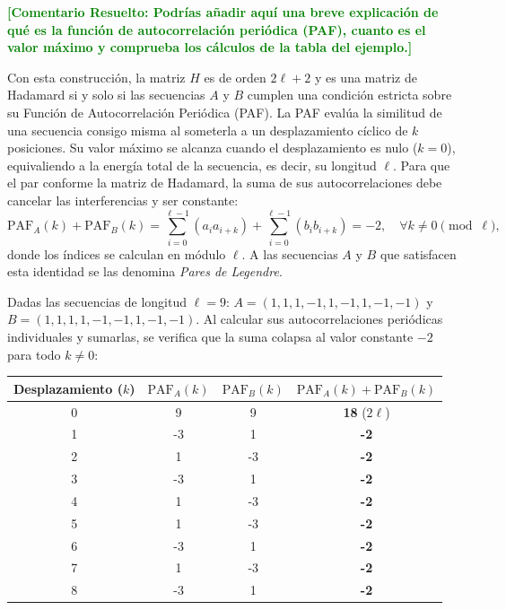 \documentclass[12pt,a4paper]{tfg_domingo}
\newcommand{\PAF}{\textrm{PAF}}
\newcommand{\ComentarioR}[1]{\textcolor{green}{\textbf{[Comentario Resuelto:
#1]}}}
\begin{document}
  \ComentarioR{Podrías añadir aquí una breve explicación de qué es la
  función de autocorrelación periódica (PAF), cuanto es el valor
  máximo y comprueba los cálculos de la tabla del ejemplo.}

  
Con esta construcción, la matriz $H$ es de orden $2\ell + 2$ y es una matriz de Hadamard si y solo si las secuencias $A$ y $B$ cumplen una condición estricta sobre su Función de Autocorrelación Periódica (PAF). La PAF evalúa la similitud de una secuencia consigo misma al someterla a un desplazamiento cíclico de $k$ posiciones. Su valor máximo se alcanza cuando el desplazamiento es nulo ($k=0$), equivaliendo a la energía total de la secuencia, es decir, su longitud $\ell$. Para que el par conforme la matriz de Hadamard, la suma de sus autocorrelaciones debe cancelar las interferencias y ser constante:
\[
 \PAF_{A}(k) + \PAF_{B}(k) = \sum_{i=0}^{\ell-1} (a_i a_{i+k}) + \sum_{i=0}^{\ell-1}( b_i b_{i+k}) = -2, \quad \forall k \neq 0 \pmod \ell,
\]
donde los índices se calculan en módulo $\ell$. A las secuencias $A$ y $B$ que satisfacen esta identidad se las denomina \emph{Pares de Legendre}.

\begin{tcolorbox}[colback=blue!5!white,colframe=blue!75!black,title=Ejemplo de Pares de Legendre]
  Dadas las secuencias de longitud $\ell=9$: 
  $A = (1, 1, 1, -1, 1, -1, 1, -1, -1)$ y $B = (1, 1, 1, 1, -1, -1, 1, -1, -1)$.
  Al calcular sus autocorrelaciones periódicas individuales y sumarlas, se verifica que la suma colapsa al valor constante $-2$ para todo $k \neq 0$:
  \begin{center}
        \begin{tabular}{c|c|c|c}
          Desplazamiento ($k$) & $\text{PAF}_A(k)$ & $\text{PAF}_B(k)$ & $\text{PAF}_A(k) + \text{PAF}_B(k)$ \\
          \hline
          0 & 9 & 9 & \textbf{18} ($2\ell$) \\
          1 & -3 & 1 & \textbf{-2} \\
          2 & 1 & -3 & \textbf{-2} \\
          3 & -3 & 1 & \textbf{-2} \\
          4 & 1 & -3 & \textbf{-2} \\
          5 & 1 & -3 & \textbf{-2} \\
          6 & -3 & 1 & \textbf{-2} \\
          7 & 1 & -3 & \textbf{-2} \\
          8 & -3 & 1 & \textbf{-2} \\
        \end{tabular}
      \end{center}
\end{tcolorbox}
\end{document}
